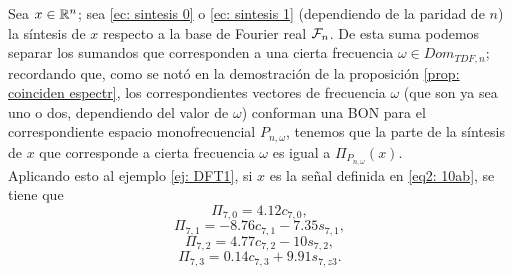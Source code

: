 \begin{nota}
\label{nota: proyeciones monof TDF}
Sea $x \in \mathbb{R}^{n}$; sea 
\eqref{ec: sintesis 0} o 
\eqref{ec: sintesis 1}
(dependiendo de la paridad de $n$)
la síntesis de $x$ respecto a la base de Fourier
real $\mathcal{F}_{n}$. De esta suma podemos
separar los sumandos que corresponden a una
cierta frecuencia $\omega \in Dom_{TDF, n}$; recordando
que, como se notó
en la demostración de la proposición
\ref{prop: coinciden espectr}, 
los correspondientes vectores
de frecuencia $\omega$ (que son ya sea uno o dos, dependiendo del valor
de $\omega$) conforman una BON para el correspondiente
espacio monofrecuencial 
$P_{n, \omega}$, tenemos que la parte de la 
síntesis de $x$ que corresponde a 
cierta frecuencia $\omega$ es igual a
$\Pi_{P_{n, \omega}}(x)$. \\

Aplicando esto al ejemplo \ref{ej: DFT1},
si $x$ es la señal definida en 
\ref{eq2: 10ab}, se tiene que
\[
\Pi_{7, 0} = 4.12 c_{7,0}, 
\]
\[
\Pi_{7, 1} = -8.76 c_{7,1} - 7.35 s_{7,1}, 
\]
\[
\Pi_{7, 2} = 4.77 c_{7,2} - 10 s_{7,2}, 
\]
\[
\Pi_{7, 3} = 0.14 c_{7,3} + 9.91 s_{7,z3}.
\]
\end{nota}



